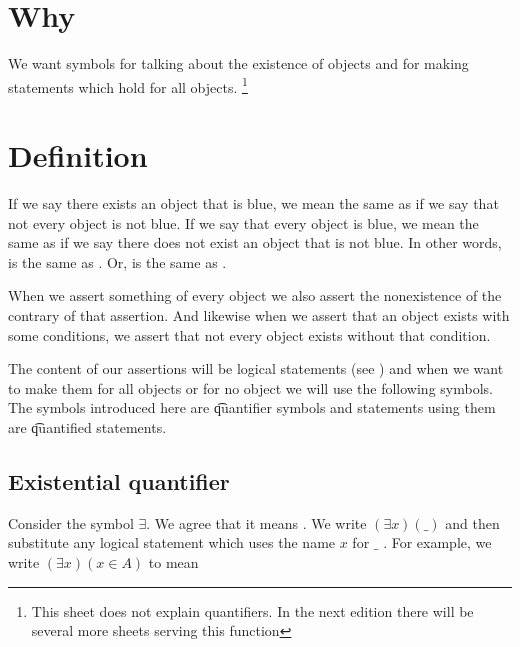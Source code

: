 
\section*{Why}

We want symbols for talking about the existence of objects and for making statements which hold for all objects.
  \ifhmode\unskip\fi\footnote{
This sheet does not explain quantifiers. In the next edition there will be several more sheets serving this function
  }

\section*{Definition}

If we say there exists an object that is blue, we mean the same as if we say that not every object is not blue.
If we say that every object is blue, we mean the same as if we say there does not exist an object that is not blue.
In other words,  is the same as .
Or,  is the same as .

When we assert something of every object we also assert the nonexistence of the contrary of that assertion.
And likewise when we assert that an object exists with some conditions, we assert that not every object exists without that condition.

The content of our assertions will be logical statements (see ) and when we want to make them for all objects or for no object we will use the following symbols.
The symbols introduced here are \t{quantifier symbols} and statements using them are \t{quantified statements}.

\subsection*{Existential quantifier}

Consider the symbol $\exists $.
We agree that it means .
We write $(\exists x)(\_)$ and then substitute any logical statement which uses the name $x$ for $\_$ .
For example, we write $(\exists x)(x \in A)$ to mean 

